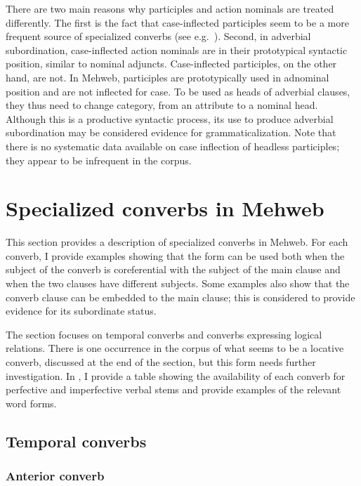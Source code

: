 ﻿\documentclass[output=paper]{langsci/langscibook}
\begin{document}
There are two main reasons why participles and action nominals are
treated differently. The first is the fact that case-inflected
participles seem to be a more frequent source of specialized converbs
(see e.g.\ \citealt{creissels2010}). Second, in adverbial subordination,
case-inflected action nominals are in their prototypical syntactic
position, similar to nominal adjuncts. Case-inflected participles, on
the other hand, are not. In Mehweb, participles are prototypically used in
adnominal position and are not inflected for case. To be used as heads
of adverbial clauses, they thus need to change category, from an
attribute to a nominal head. Although this is a productive syntactic
process, its use to produce adverbial subordination may be considered
evidence for grammaticalization. Note that there is no systematic data available on
case inflection of headless participles; they appear to be infrequent in the corpus.

\section{Specialized converbs in Mehweb}\label{specialized-converbs-in-mehweb}

This section provides a description of specialized converbs in Mehweb.
For each converb, I provide examples showing that the form can be used
both when the subject of the converb is coreferential with the subject of
the main clause and when the two clauses have different subjects. Some
examples also show that the converb clause can be embedded to the main
clause; this is considered to provide evidence for its subordinate status.

The section focuses on temporal converbs and converbs expressing logical
relations. There is one occurrence in the corpus of what seems to be a locative
converb, discussed at the end of the section, but this form needs
further investigation. In , I provide a table showing the
availability of each converb for perfective and imperfective verbal
stems and provide examples of the relevant word forms.

\subsection{Temporal converbs}

\subsubsection{Anterior converb}
\end{document}

